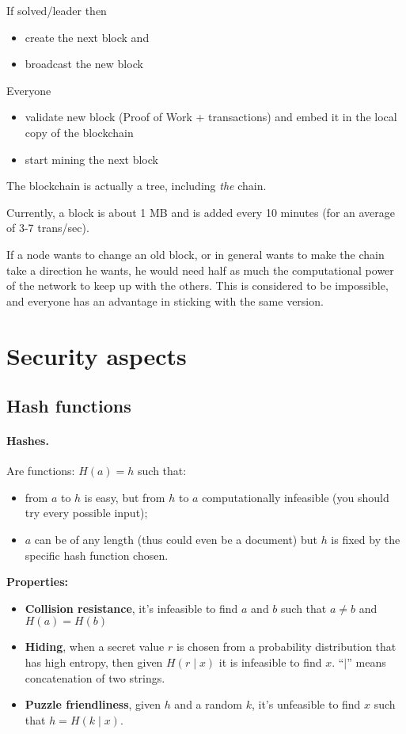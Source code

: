 If solved/leader then
\begin{itemize}
    \item create the next block and
    \item broadcast the new block
\end{itemize}

Everyone
\begin{itemize}
    \item validate new block (Proof of Work + transactions) and embed it in the local copy of the blockchain
    \item start mining the next block
\end{itemize}

The blockchain is actually a tree, including \emph{the} chain.

Currently, a block is about 1 MB and is added every 10 minutes (for an average of 3-7 trans/sec).

If a node wants to change an old block, or in general wants to make the chain take a direction he wants, he would need half as much the computational power of the network to keep up with the others. This is considered to be impossible, and everyone has an advantage in sticking with the same version.

\section{Security aspects}

\subsection{Hash functions}

\paragraph*{Hashes.} Are functions: $H(a)=h$ such that:
\begin{itemize}
    \item from $a$ to $h$ is easy, but from $h$ to $a$ computationally infeasible (you should try every possible input);
    \item $a$ can be of any length (thus could even be a document) but $h$ is fixed by the specific hash function chosen.
\end{itemize}

\textbf{Properties:}
\begin{itemize}
    \item \textbf{Collision resistance}, it's infeasible to find $a$ and $b$ such that $a\neq b$ and $H(a)=H(b)$
    \item \textbf{Hiding}, when a secret value $r$ is chosen from a probability distribution that has high entropy, then given $H(r\mid x)$ it is infeasible to find $x$. ``$\mid$'' means concatenation of two strings.
    \item \textbf{Puzzle friendliness}, given $h$ and a random $k$, it's unfeasible to find $x$ such that $h=H(k\mid x)$.
\end{itemize}

